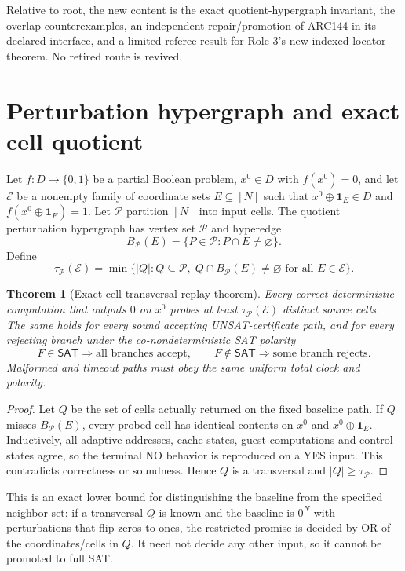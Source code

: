 \documentclass[11pt]{article}
\newtheorem{theorem}{Theorem}
\newcommand{\SAT}{\mathsf{SAT}}
\begin{document}
Relative to root, the new content is the exact quotient-hypergraph invariant,
the overlap counterexamples, an independent repair/promotion of ARC144 in its
declared interface, and a limited referee result for Role 3's new indexed
locator theorem.  No retired route is revived.

\section{Perturbation hypergraph and exact cell quotient}
Let $f:D\to\{0,1\}$ be a partial Boolean problem, $x^0\in D$ with
$f(x^0)=0$, and let $\mathcal E$ be a nonempty family of coordinate sets
$E\subseteq[N]$ such that $x^0\oplus\mathbf 1_E\in D$ and
$f(x^0\oplus\mathbf 1_E)=1$.  Let $\mathcal P$ partition $[N]$ into input
cells.  The quotient perturbation hypergraph has vertex set $\mathcal P$ and
hyperedge
\[
 B_{\mathcal P}(E)=\{P\in\mathcal P:P\cap E\ne\varnothing\}.
\]
Define
\[
 \tau_{\mathcal P}(\mathcal E)=
 \min\{|Q|:Q\subseteq\mathcal P,\;
 Q\cap B_{\mathcal P}(E)\ne\varnothing\text{ for all }E\in\mathcal E\}.
\]

\begin{theorem}[Exact cell-transversal replay theorem]\label{th:tau}
Every correct deterministic computation that outputs $0$ on $x^0$ probes at
least $\tau_{\mathcal P}(\mathcal E)$ distinct source cells.  The same holds
for every sound accepting UNSAT-certificate path, and for every rejecting
branch under the co-nondeterministic SAT polarity
\[
 F\in\SAT\Rightarrow\text{all branches accept},\qquad
 F\notin\SAT\Rightarrow\text{some branch rejects}.
\]
Malformed and timeout paths must obey the same uniform total clock and
polarity.
\end{theorem}
\begin{proof}
Let $Q$ be the set of cells actually returned on the fixed baseline path.
If $Q$ misses $B_{\mathcal P}(E)$, every probed cell has identical contents
on $x^0$ and $x^0\oplus\mathbf1_E$.  Inductively, all adaptive addresses,
cache states, guest computations and control states agree, so the terminal
NO behavior is reproduced on a YES input.  This contradicts correctness or
soundness.  Hence $Q$ is a transversal and $|Q|\ge\tau_{\mathcal P}$.
\end{proof}

This is an exact lower bound for distinguishing the baseline from the
specified neighbor set: if a transversal $Q$ is known and the baseline is
$0^N$ with perturbations that flip zeros to ones, the restricted promise is
decided by OR of the coordinates/cells in $Q$.  It need not decide any other
input, so it cannot be promoted to full SAT.
\end{document}
